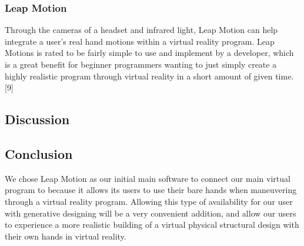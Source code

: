 \documentclass[letterpaper,10pt,onecolumn,compsoc]{IEEEtran}
\begin{document}
\subsubsection{Leap Motion}


\noindent
Through the cameras of a headset and infrared light, Leap Motion can help integrate a user's real hand motions within a virtual reality program. Leap Motions is rated to be fairly simple to use and implement by a developer, which is a great benefit for beginner programmers wanting to just simply create a highly realistic program through virtual reality in a short amount of given time. [9]

\subsection{Discussion}

\iffalse
\noindent\leavevmode\rlap{\textbf{0,0}}\hfill{\textbf{0,1}}\hfill\llap{\textbf{0,2}}\par

\noindent\leavevmode\rlap{\textbf{1,0}}\hfill{\textbf{1,1}}\hfill\llap{\textbf{1,2}}\par

\noindent\leavevmode\rlap{\textbf{2,0}}\hfill{\textbf{2,1}}\hfill\llap{\textbf{2,2}}\par
\fi

\subsection{Conclusion}

\noindent
We chose Leap Motion as our initial main software to connect our main virtual program to because it allows its users to use their bare hands when maneuvering through a virtual reality program. Allowing this type of availability for our user with generative designing will be a very convenient addition, and allow our users to experience a more realistic building of a virtual physical structural design with their own hands in virtual reality.

\newpage

\end{document}
